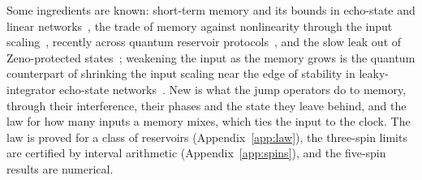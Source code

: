 Some ingredients are known: short-term memory and its bounds in echo-state and linear
networks~\cite{JaegerESP2001,White2004,Ganguli2008}, the trade of memory against nonlinearity through the input
scaling~\cite{Dambre2012,Inubushi2017}, recently across quantum reservoir protocols~\cite{Cindrak2026}, and the slow
leak out of Zeno-protected states~\cite{Zanardi2014,Reiter2012}; weakening the input as the memory grows is the quantum
counterpart of shrinking the input scaling near the edge of stability in leaky-integrator echo-state
networks~\cite{Jaeger2007Leaky}. New is what the jump operators do to memory, through their interference, their
phases and the state they leave behind, and the law for how many inputs a memory mixes, which ties the input to the
clock. The law is proved for a class of reservoirs (Appendix~\ref{app:law}), the three-spin limits are certified by
interval arithmetic (Appendix~\ref{app:spins}), and the five-spin results are numerical.

